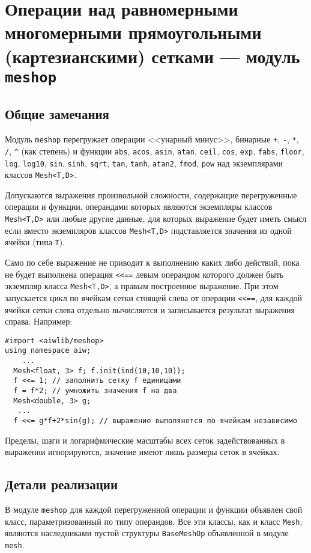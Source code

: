 \section{Операции над равномерными многомерными прямоугольными (картезианскими) сетками --- модуль {\tt meshop}}\label{meshop:sec}
\subsection{Общие замечания}
Модуль \verb'meshop' перегружает операции  <<унарный минус>>, бинарные \verb'+', \verb'-', \verb'*', \verb'/', \verb'^' (как степень) и
функции \verb'abs', \verb'acos', \verb'asin', \verb'atan', \verb'ceil', \verb'cos', \verb'exp',  \verb'fabs', \verb'floor', \verb'log', \verb'log10', \verb'sin',
\verb'sinh',  \verb'sqrt', \verb'tan', \verb'tanh', \verb'atan2', \verb'fmod',  \verb'pow' над экземплярами классов \verb'Mesh<T,D>'.

Допускаются выражения произвольной сложности, содержащие перегруженные операции и функции, операндами которых являются экземпляры классов
\verb'Mesh<T,D>' или любые другие данные, для которых выражение будет иметь смысл если вместо
экземпляров классов \verb'Mesh<T,D>' подставляется значения из одной ячейки (типа \verb'T').

Само по себе выражение не приводит к выполнению каких либо действий, пока не будет выполнена операция \verb'<<=='
левым операндом которого должен быть экземпляр класса \verb'Mesh<T,D>', а правым построенное выражение. При этом запускается цикл по ячейкам
сетки стоящей слева от операции \verb'<<==', для каждой ячейки сетки слева отдельно вычисляется и записывается результат выражения справа.
Например:
\begin{verbatim}
#import <aiwlib/meshop>
using namespace aiw;
    ...
  Mesh<float, 3> f; f.init(ind(10,10,10));
  f <<= 1; // заполнить сетку f единицами
  f = f*2; // умножить значения f на два  
  Mesh<double, 3> g;   
   ...
  f <<= g*f+2*sin(g); // выражение выполянется по ячейкам независимо 
\end{verbatim}
Пределы, шаги и логарифмические масштабы всех сеток задействованных в выражении игнорируются, значение имеют лишь
размеры сеток в ячейках. 

\subsection{Детали реализации}
В модуле \verb'meshop' для каждой перегруженной операции и функции объявлен свой класс, параметризованный по типу операндов.
Все эти классы, как и класс \verb'Mesh', являются наследниками пустой структуры \verb'BaseMeshOp' объявленной в модуле \verb'mesh'.

